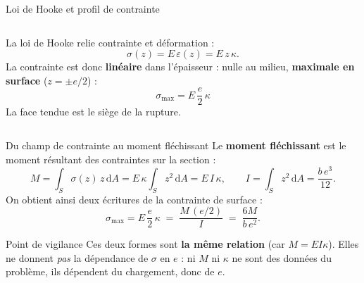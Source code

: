 \documentclass[11pt,aspectratio=169]{beamer}
\begin{document}
\begin{frame}{Loi de Hooke et profil de contrainte}
  \begin{columns}[c]
    \centering
    \footnotesize
    La loi de Hooke relie contrainte et déformation :
    \[ \sigma(z)=E\,\varepsilon(z)=E\,z\,\kappa . \]
    La contrainte est donc \textbf{linéaire} dans l'épaisseur : nulle au milieu,
    \textbf{maximale en surface} ($z=\pm e/2$) :
    \[ \boxed{\;\sigma_{\max}=E\,\frac{e}{2}\,\kappa\;} \]
    La face tendue est le siège de la rupture.
  \end{columns}
\end{frame}

\begin{frame}{Du champ de contrainte au moment fléchissant}
  \footnotesize
  Le \textbf{moment fléchissant} est le moment résultant des contraintes sur la
  section :
  \[ M=\int_{S}\sigma(z)\,z\,\mathrm{d}A
      =E\,\kappa\int_{S} z^{2}\,\mathrm{d}A=E\,I\,\kappa,
      \qquad I=\int_{S}z^{2}\,\mathrm{d}A=\frac{b\,e^{3}}{12}. \]
  On obtient ainsi deux écritures de la contrainte de surface :
  \[ \sigma_{\max}=E\,\frac{e}{2}\,\kappa \;=\; \frac{M\,(e/2)}{I}
      \;=\;\frac{6M}{b\,e^{2}} . \]
  \begin{block}{Point de vigilance}
  Ces deux formes sont \textbf{la même relation} (car $M=EI\kappa$). Elles ne
  donnent \emph{pas} la dépendance de $\sigma$ en $e$ : ni $M$ ni $\kappa$ ne
  sont des données du problème, ils dépendent du chargement, donc de $e$.
  \end{block}
\end{frame}
\end{document}
